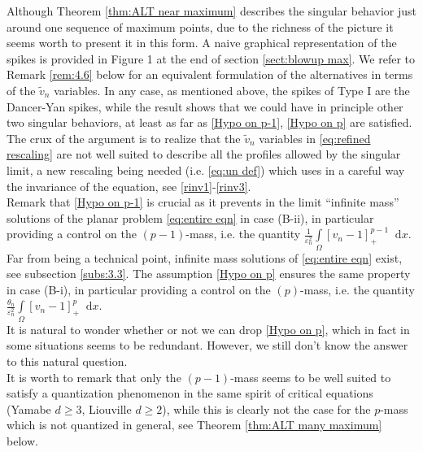 \documentclass[10pt]{amsart}
\newcommand{\dd}{\mathop{}\!\mathrm{d}}
\newcommand{\eps}{\varepsilon}
\newcommand{\om}{\Omega}
\begin{document}
Although Theorem \ref{thm:ALT near maximum} describes the singular behavior just around one sequence of maximum points,
due to the richness of the picture it seems worth to present it in this form. A naive graphical representation of the spikes
is provided in Figure 1 at the end of section \ref{sect:blowup max}.
We refer to Remark \ref{rem:4.6} below for an equivalent formulation of the alternatives in terms of the $\tilde{v}_n$ variables.
In any case, as mentioned above, the spikes of Type I are the Dancer-Yan spikes, while the result shows
that we could have in principle other two singular behaviors, at least as far as \eqref{Hypo on p-1}, \eqref{Hypo on p} are satisfied.
The crux of the argument is
to realize that the $\tilde{v}_n$ variables in \eqref{eq:refined rescaling} are not well suited to describe all the profiles allowed by the singular limit,
a new rescaling being needed (i.e. \eqref{eq:un def}) which uses in a careful way the invariance of the equation, see \eqref{rinv1}-\eqref{rinv3}.\\

Remark that
\eqref{Hypo on p-1} is crucial as it prevents in the limit ``infinite mass'' solutions of the planar problem \eqref{eq:entire eqn} in case (B-ii),
in particular providing a control on the $(p-1)$-mass, i.e. the quantity $\frac{1}{\eps_n^2}\int\limits_{\om} [v_n-1]_+^{p-1}\dd{x}$.
Far from being a technical point, infinite mass solutions of \eqref{eq:entire eqn} exist, see subsection \ref{subs:3.3}.
The assumption \eqref{Hypo on p} ensures the same property in case (B-i),
in particular providing a control on the $(p)$-mass, i.e. the quantity $\frac{\theta_n}{\eps_n^2}\int\limits_{\om} [v_n-1]_+^{p}\dd{x}$.\\
It is natural to wonder whether or not we can drop \eqref{Hypo on p}, which in fact in some situations seems to be redundant.
However, we still don't know the answer to this natural question.\\

It is worth to remark that only the $(p-1)$-mass
seems to be well suited to satisfy a quantization phenomenon in the same spirit of critical equations (Yamabe $d\geq 3$, Liouville $d\geq 2$),
while this is clearly not the case for the  $p$-mass which is not quantized in general, see Theorem \ref{thm:ALT many maximum} below.

\bigskip
\end{document}
